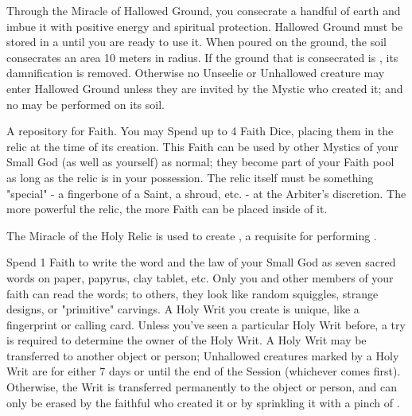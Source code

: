 \begin{multicols*}{2}


Through the Miracle of Hallowed Ground, you consecrate a handful of earth and imbue it with positive energy and spiritual protection. Hallowed Ground must be stored in a  until you are ready to use it. When poured on the ground, the soil consecrates an area 10 meters in radius. If the ground that is consecrated is , its damnification is removed. Otherwise no Unseelie or Unhallowed creature may enter Hallowed Ground unless they are invited by the Mystic who created it; and no  may be performed on its soil.



A repository for Faith.  You may Spend up to 4 Faith Dice, placing them in the relic at the time of its creation.  This Faith can be used by other Mystics of your Small God (as well as yourself) as normal; they become part of your Faith pool as long as the relic is in your possession.  The relic itself must be something "special" - a fingerbone of a Saint, a shroud, etc.  - at the Arbiter's discretion.  The more powerful the relic, the more Faith can be placed inside of it.

The Miracle of the Holy Relic is used to create , a requisite for performing .


\cbreak


Spend 1 Faith to write the word and the law of your Small God as seven sacred words on paper, papyrus, clay tablet, etc. Only you and other members of your faith can read the words; to others, they look like random squiggles, strange designs, or "primitive" carvings. A Holy Writ you create is unique, like a fingerprint or calling card. Unless you've seen a particular Holy Writ before, a  try is required to determine the owner of the Holy Writ. A Holy Writ may be transferred to another object or person; Unhallowed creatures marked by a Holy Writ are  for either 7 days or until the end of the Session (whichever comes first). Otherwise, the Writ is transferred permanently to the object or person, and can only be erased by the faithful who created it or by sprinkling it with a pinch of .



\end{multicols*}
